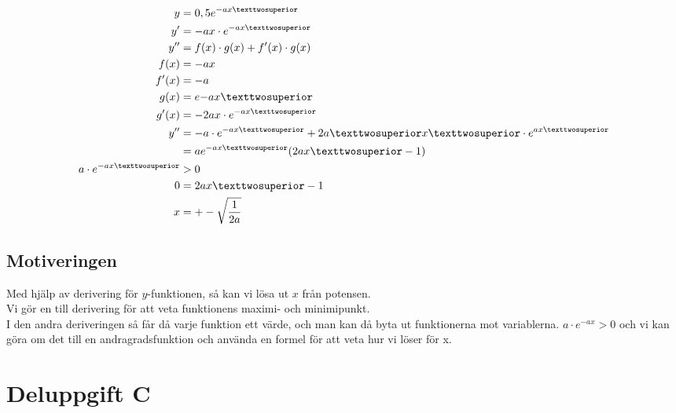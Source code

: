 \documentclass[a4paper,12pt]{article}
\begin{document}
        \begin{align}
          \label{eq:2}
          y &= 0,5e^{-ax²} \nonumber
          \\
          y^{\prime} &= -ax \cdot e^{-ax²} \nonumber
          \\
          y^{\prime \prime} &= f(x) \cdot g(x) + f^{\prime}(x) \cdot g(x) 
          \nonumber
          \\
          f(x) &= -ax \nonumber 
          \\
          f^{\prime}(x) &= -a \nonumber 
          \\
          g(x) &= e{-ax²} \nonumber 
          \\
          g^{\prime}(x) &= -2ax \cdot e^{-ax²} \nonumber 
          \\
          y^{\prime \prime} &= -a \cdot e^{-ax²} + 2a²x² \cdot e^{\-ax²} 
          \nonumber 
          \\
          &= ae^{-ax²}(2ax²-1) \nonumber 
          \\
          a \cdot e^{-ax²} &> 0 \nonumber 
          \\
          0 &= 2ax²-1 \nonumber 
          \\
          x &= +-\sqrt{\frac{1}{2a}}
        \end{align}

        \newpage
      \subsection{Motiveringen}

        Med hjälp av derivering för $y$-funktionen, så kan vi lösa ut $x$ från 
        potensen.
        \\
        Vi gör en till derivering för att veta funktionens maximi- och 
        minimipunkt. 
        \\
        I den andra deriveringen så får då varje funktion ett värde, och man kan
        då byta ut funktionerna mot variablerna. $a \cdot e^{-ax} > 0$ och vi 
        kan göra om det till en andragradsfunktion och använda en formel för 
        att veta hur vi löser för x.

\section{Deluppgift C}
  \label{sec:uppg3}
\end{document}
